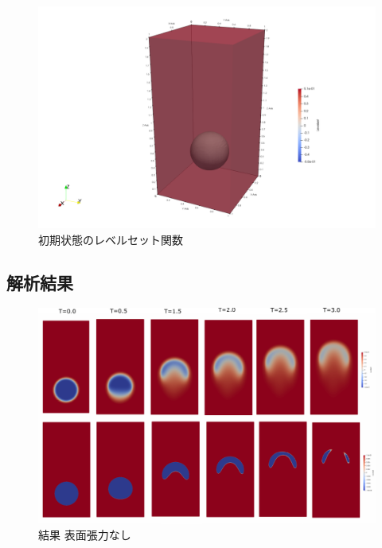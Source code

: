 \documentclass[8pt,a4paper]{article}
\begin{document}
\begin{figure}[htbp]
	\centering
	\includegraphics[width=10truecm]{pics/3d-bubble/levelset_t0_3d.pdf}
	\caption{初期状態のレベルセット関数}
	\label{fig:3d-bubble-levelset_t0_3d}
\end{figure}


\subsection{解析結果}

\begin{figure}[htbp]
	\centering
	\includegraphics[width=18truecm]{pics/3d-bubble/levelset_t0-3.pdf}
	\caption{結果 表面張力なし}
	\label{fig:3d-bubble-levelset_t0-3}
\end{figure}
\end{document}
